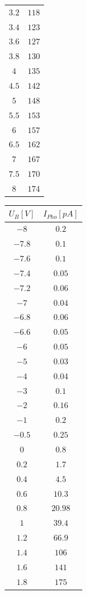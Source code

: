 \begin{center}
\begin{longtable}{c|c}
\(3.2\) & \( 118\) \\ 
\(3.4\) & \( 123\) \\ 
\(3.6\) & \( 127\) \\ 
\(3.8\) & \( 130\) \\ 
\(4\) & \( 135\) \\ 
\(4.5\) & \( 142\) \\ 
\(5\) & \( 148\) \\ 
\(5.5\) & \( 153\) \\ 
\(6\) & \( 157\) \\ 
\(6.5\) & \( 162\) \\ 
\(7\) & \( 167\) \\ 
\(7.5\) & \( 170\) \\ 
\(8\) & \( 174\) \\
\end{longtable}
\begin{longtable}{c|c}
\(U_B [V]\) & \(I_{Pho} [pA]\)\\\hline \endhead
\(-8\) & \( 0.2\) \\ 
\(-7.8\) & \( 0.1\) \\ 
\(-7.6\) & \( 0.1\) \\ 
\(-7.4\) & \( 0.05\) \\ 
\(-7.2\) & \( 0.06\) \\ 
\(-7\) & \( 0.04\) \\ 
\(-6.8\) & \( 0.06\) \\ 
\(-6.6\) & \( 0.05\) \\ 
\(-6\) & \( 0.05\) \\ 
\(-5\) & \( 0.03\) \\ 
\(-4\) & \( 0.04\) \\ 
\(-3\) & \( 0.1\) \\ 
\(-2\) & \( 0.16\) \\ 
\(-1\) & \( 0.2\) \\ 
\(-0.5\) & \( 0.25\) \\ 
\(0\) & \( 0.8\) \\ 
\(0.2\) & \( 1.7\) \\ 
\(0.4\) & \( 4.5\) \\ 
\(0.6\) & \( 10.3\) \\ 
\(0.8\) & \( 20.98\) \\ 
\(1\) & \( 39.4\) \\ 
\(1.2\) & \( 66.9\) \\ 
\(1.4\) & \( 106\) \\ 
\(1.6\) & \( 141\) \\ 
\(1.8\) & \( 175\) \\ 

\end{longtable}
\end{center}
